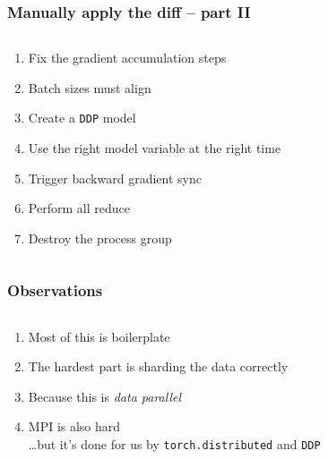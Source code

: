 \documentclass[
	notes=none,
	aspectratio=169
]{beamer}
\begin{document}

\begin{frame}
\frametitle{Manually apply the diff -- part II}

\begin{columns}[T]
\begin{column}[T]{1.0\textwidth}
\setlength{\parskip}{0.5em}

\vspace{0.0cm}
\begin{enumerate}
\setlength{\parskip}{0.0em}
\setcounter{enumi}{8}
\item Fix the gradient accumulation steps
\item Batch sizes must align
\item Create a {\tt DDP} model
\item Use the right model variable at the right time
\item Trigger backward gradient sync
\item Perform all reduce
\item Destroy the process group
\end{enumerate}

\end{column}
\end{columns}

\end{frame}
\note{
}


\begin{frame}
\frametitle{Observations}

\begin{columns}[T]
\begin{column}[T]{1.0\textwidth}
\setlength{\parskip}{0.5em}

\vspace{0.0cm}
\begin{enumerate}
\setlength{\parskip}{0.5em}
\item Most of this is boilerplate
\item The hardest part is sharding the data correctly
\item Because this is {\it data parallel}
\item MPI is also hard \\ \vspace{0.5em} \qquad \qquad \ldots but it's done for us by {\tt torch.distributed} and {\tt DDP}
\end{enumerate}

\end{column}
\end{columns}

\end{frame}
\note{
}
\end{document}
